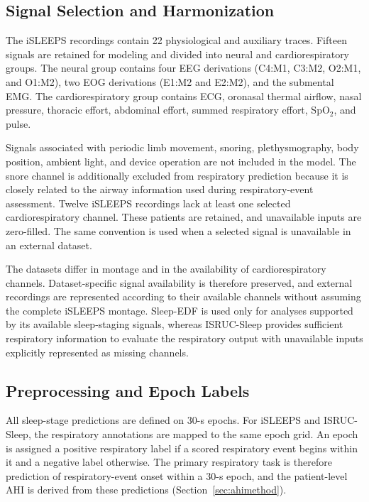 \documentclass{ieeeaccess}
\begin{document}
\subsection{Signal Selection and Harmonization}

The iSLEEPS recordings contain 22 physiological and auxiliary traces. Fifteen
signals are retained for modeling and divided into neural and
cardiorespiratory groups. The neural group contains four EEG derivations
(C4:M1, C3:M2, O2:M1, and O1:M2), two EOG derivations (E1:M2 and E2:M2), and
the submental EMG. The cardiorespiratory group contains ECG, oronasal thermal
airflow, nasal pressure, thoracic effort, abdominal effort, summed respiratory
effort, SpO$_2$, and pulse.

Signals associated with periodic limb movement, snoring, plethysmography, body
position, ambient light, and device operation are not included in the model.
The snore channel is additionally excluded from respiratory prediction because
it is closely related to the airway information used during respiratory-event
assessment. Twelve iSLEEPS recordings lack at least one selected
cardiorespiratory channel. These patients are retained, and unavailable inputs
are zero-filled. The same
convention is used when a selected signal is unavailable in an external
dataset.

The datasets differ in montage and in the availability of
cardiorespiratory channels. Dataset-specific signal availability is therefore preserved, and external recordings are represented according to their available channels without assuming the complete iSLEEPS montage. Sleep-EDF is used only for analyses supported by its available sleep-staging signals, whereas ISRUC-Sleep provides sufficient
respiratory information to evaluate the respiratory output with unavailable inputs explicitly represented as missing channels.

\subsection{Preprocessing and Epoch Labels}

All sleep-stage predictions are defined on 30-s epochs. For iSLEEPS and
ISRUC-Sleep, the respiratory annotations are mapped to the same epoch grid. An
epoch is assigned a positive respiratory label if a scored respiratory event begins
within it and a negative label otherwise. The primary
respiratory task is therefore prediction of respiratory-event onset within
a 30-s epoch, and the patient-level AHI is derived from these predictions
(Section~\ref{sec:ahimethod}).
\end{document}
